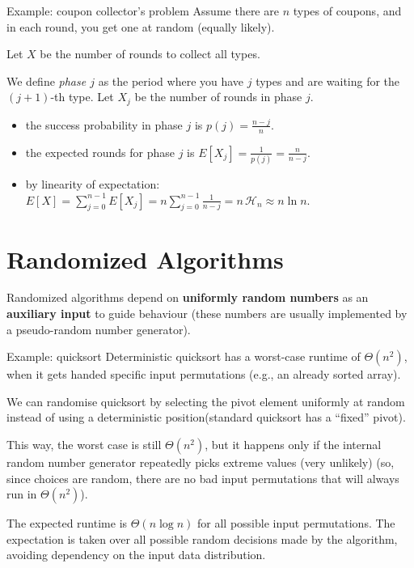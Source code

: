 \documentclass[a4paper, 11pt]{report}
\begin{document}
\begin{gframe}{Example: coupon collector's problem}
Assume there are $n$ types of coupons, and in each round, you get one at random (equally likely). 

Let $X$ be the number of rounds to collect all types. 

We define \textit{phase $j$} as the period where you have $j$ types and are waiting for the $(j+1)$-th type. Let $X_j$ be the number of rounds in phase $j$.
\begin{itemize}
    \item the success probability in phase $j$ is $p(j) = \frac{n-j}{n}$.
    \item the expected rounds for phase $j$ is $E[X_j] = \frac{1}{p(j)} = \frac{n}{n-j}$.
    \item by linearity of expectation: $E[X] = \sum_{j=0}^{n-1} E[X_j] = n \sum_{j=0}^{n-1} \frac{1}{n-j} = n \, \mathcal{H}_n \approx n \ln n$.
\end{itemize}
\end{gframe}

\section{Randomized Algorithms}
Randomized algorithms depend on \textbf{uniformly random numbers} as an \textbf{auxiliary input} to guide behaviour (these numbers are usually implemented by a pseudo-random number generator).

\begin{gframe}{Example: quicksort}
Deterministic quicksort has a worst-case runtime of $\Theta(n^2)$, when it gets handed specific input permutations (e.g., an already sorted array). 

We can randomise quicksort by selecting the pivot element uniformly at random instead of using a deterministic position(standard quicksort has a ``fixed'' pivot).

This way, the worst case is still $\Theta(n^2)$, but it happens only if the internal random number generator repeatedly picks extreme values (very unlikely) (so, since choices are random, there are no bad input permutations that will always run in $\Theta(n^{2})$).

The expected runtime is $\Theta(n \log n)$ for all possible input permutations. The expectation is taken over all possible random decisions made by the algorithm, avoiding dependency on the input data distribution.
\end{gframe}
\end{document}
